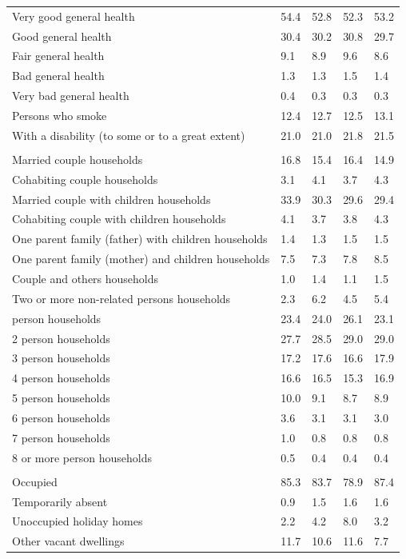 \documentclass{article}
\begin{document}
\begin{table}[h]
\begin{tabular}{KTTTT}
    \hline
Very good general health & 54.4& 52.8&52.3& 53.2\\
Good general health & 30.4& 30.2& 30.8& 29.7\\
Fair general health & 9.1& 8.9&9.6& 8.6\\
Bad general health & 1.3& 1.3&1.5& 1.4\\
Very bad general health & 0.4& 0.3&0.3& 0.3\\
    \hline
Persons who smoke & 12.4& 12.7&12.5& 13.1\\
    \hline
With a disability (to some or to a great extent) & 21.0& 21.0&21.8& 21.5\\
\hline
    \\ 
    \hline
Married couple households & 16.8& 15.4& 16.4& 14.9\\
Cohabiting couple households & 3.1& 4.1& 3.7& 4.3\\
Married couple with children households & 33.9& 30.3& 29.6& 29.4\\
Cohabiting couple with children households & 4.1& 3.7& 3.8& 4.3\\
One parent family (father) with  children households & 1.4& 1.3& 1.5& 1.5\\
One parent family (mother) and children households & 7.5& 7.3& 7.8& 8.5\\
Couple and others households  & 1.0& 1.4& 1.1& 1.5\\
Two or more non-related persons households & 2.3& 6.2& 4.5& 5.4\\
     person households & 23.4& 24.0& 26.1& 23.1\\
2 person households & 27.7& 28.5& 29.0& 29.0\\
3 person households & 17.2& 17.6& 16.6& 17.9\\
4 person households & 16.6& 16.5& 15.3& 16.9\\
5 person households & 10.0&  9.1&  8.7&  8.9\\
6 person households & 3.6& 3.1& 3.1& 3.0\\
7 person households & 1.0& 0.8& 0.8& 0.8\\
8 or more person households & 0.5& 0.4& 0.4& 0.4\\
\hline
    \\ 
    \hline
Occupied & 85.3& 83.7& 78.9& 87.4\\
Temporarily absent & 0.9& 1.5& 1.6& 1.6\\
Unoccupied holiday homes & 2.2& 4.2& 8.0& 3.2\\
Other vacant dwellings & 11.7& 10.6& 11.6&  7.7\\
\hline
\end{tabular}
\end{table}
\end{document}

